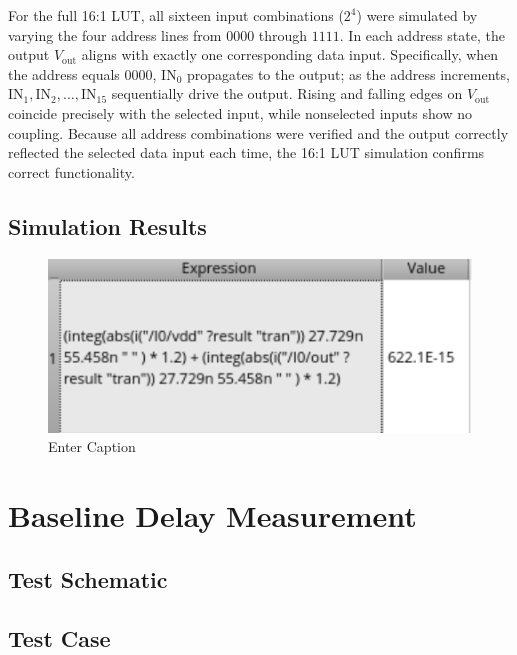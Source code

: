 \documentclass[12pt]{article}
\begin{document}
For the full 16:1 LUT, all sixteen input combinations (\(2^4\)) were simulated by varying the four address lines from \(0000\) through \(1111\). 
In each address state, the output \(V_{\text{out}}\) aligns with exactly one corresponding data input. 
Specifically, when the address equals \(0000\), \(\text{IN}_0\) propagates to the output; as the address increments, \(\text{IN}_1, \text{IN}_2, \ldots, \text{IN}_{15}\) sequentially drive the output. 
Rising and falling edges on \(V_{\text{out}}\) coincide precisely with the selected input, while nonselected inputs show no coupling. 
Because all address combinations were verified and the output correctly reflected the selected data input each time, the 16:1 LUT simulation confirms correct functionality.


\newpage

\subsection{Simulation Results}
\begin{figure}[H]
    \centering
    \includegraphics[width=0.5\linewidth]{writeup//figures/baseline_energy_val.png}
    \caption{Enter Caption}
\end{figure}


\newpage

\section{Baseline Delay Measurement}
\subsection{Test Schematic}



\newpage

\subsection{Test Case}



\newpage
\end{document}
